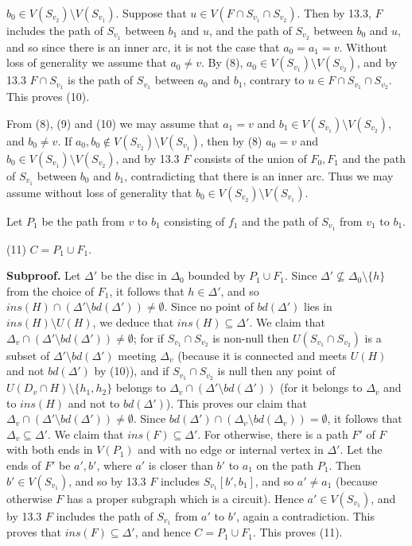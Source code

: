 \noindent $b_0 \in V(S_{v_2}) \setminus V(S_{v_1})$. Suppose that $u \in V(F \cap S_{v_1} \cap S_{v_2})$. Then by 13.3, $F$ includes the path of $S_{v_1}$ between $b_1$ and $u$, and the path of $S_{v_2}$ between $b_0$ and $u$, and so since there is an inner arc, it is not the case that $a_0 = a_1 = v$. Without loss of generality we assume that $a_0 \ne v$. By (8), $a_0 \in V(S_{v_1}) \setminus V(S_{v_2})$, and by 13.3 $F \cap S_{v_1}$ is the path of $S_{v_1}$ between $a_0$ and $b_1$, contrary to $u \in F \cap S_{v_1} \cap S_{v_2}$. This proves (10).

From (8), (9) and (10) we may assume that $a_1 = v$ and $b_1 \in V(S_{v_1}) \setminus V(S_{v_2})$, and $b_0 \ne v$. If $a_0, b_0 \notin V(S_{v_2}) \setminus V(S_{v_1})$, then by (8) $a_0 = v$ and $b_0 \in V(S_{v_1}) \setminus V(S_{v_2})$, and by 13.3 $F$ consists of the union of $F_0, F_1$ and the path of $S_{v_1}$ between $b_0$ and $b_1$, contradicting that there is an inner arc. Thus we may assume without loss of generality that $b_0 \in V(S_{v_2}) \setminus V(S_{v_1})$.

Let $P_1$ be the path from $v$ to $b_1$ consisting of $f_1$ and the path of $S_{v_1}$ from $v_1$ to $b_1$.

\hspace*{12pt}(11) $C = P_1 \cup F_1$.

\textbf{Subproof.} Let $\Delta'$ be the disc in $\Delta_0$ bounded by $P_1 \cup F_1$. Since $\Delta' \nsubseteq \Delta_0 \setminus \{h\}$ from the choice of $F_1$, it follows that $h \in \Delta'$, and so $ins(H) \cap (\Delta' \setminus bd(\Delta')) \ne \emptyset$. Since no point of $bd(\Delta')$ lies in $ins(H) \setminus U(H)$, we deduce that $ins(H) \subseteq \Delta'$. We claim that $\Delta_v \cap (\Delta' \setminus bd(\Delta')) \ne \emptyset$; for if $S_{v_1} \cap S_{v_2}$ is non-null then $U(S_{v_1} \cap S_{v_2})$ is a subset of $\Delta' \setminus bd(\Delta')$ meeting $\Delta_v$ (because it is connected and meets $U(H)$ and not $bd(\Delta')$ by (10)), and if $S_{v_1} \cap S_{v_2}$ is null then any point of $U(D_v \cap H) \setminus \{h_1, h_2\}$ belongs to $\Delta_v \cap (\Delta' \setminus bd(\Delta'))$ (for it belongs to $\Delta_v$ and to $ins(H)$ and not to $bd(\Delta')$). This proves our claim that $\Delta_v \cap (\Delta' \setminus bd(\Delta')) \ne \emptyset$. Since $bd(\Delta') \cap (\Delta_v \setminus bd(\Delta_v)) = \emptyset$, it follows that $\Delta_v \subseteq \Delta'$. We claim that $ins(F) \subseteq \Delta'$. For otherwise, there is a path $F'$ of $F$ with both ends in $V(P_1)$ and with no edge or internal vertex in $\Delta'$. Let the ends of $F'$ be $a', b'$, where $a'$ is closer than $b'$ to $a_1$ on the path $P_1$. Then $b' \in V(S_{v_1})$, and so by 13.3 $F$ includes $S_{v_1}[b', b_1]$, and so $a' \ne a_1$ (because otherwise $F$ has a proper subgraph which is a circuit). Hence $a' \in V(S_{v_1})$, and by 13.3 $F$ includes the path of $S_{v_1}$ from $a'$ to $b'$, again a contradiction. This proves that $ins(F) \subseteq \Delta'$, and hence $C = P_1 \cup F_1$. This proves (11).

